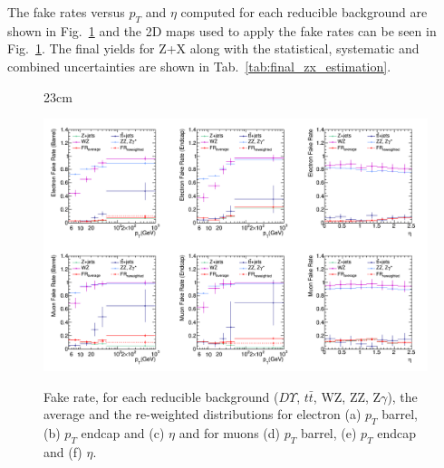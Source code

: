The fake rates versus $p_{T}$ and $\eta$ computed for each reducible background are shown in Fig.~\ref{fig:fr_pt_eta_1D_systematics} and the 2D maps used to apply the fake rates can be seen in Fig.~\ref{fig:fr_pt_eta_1D_systematics}. The final yields for Z+X along with the statistical, systematic and combined uncertainties are shown in Tab.~\ref{tab:final_zx_estimation}.

\begin{landscape}
\begin{figure}[htbp]{23cm}
	\caption{Fake rate, for each reducible background ($D\varUpsilon$, $t\bar{t}$, WZ, ZZ, Z$\gamma$), the average and the re-weighted distributions for electron (a) $p_{T}$ barrel, (b) $p_{T}$ endcap and (c) $\eta$ and for muons (d) $p_{T}$ barrel, (e) $p_{T}$ endcap and (f) $\eta$.}
	\centering
	\includegraphics[scale=0.5]{ChapterAnalysis/figs/fake_rate_1D_pt_eta_for_systematics}
	\label{fig:fr_pt_eta_1D_systematics}
\end{figure}
\end{landscape}

